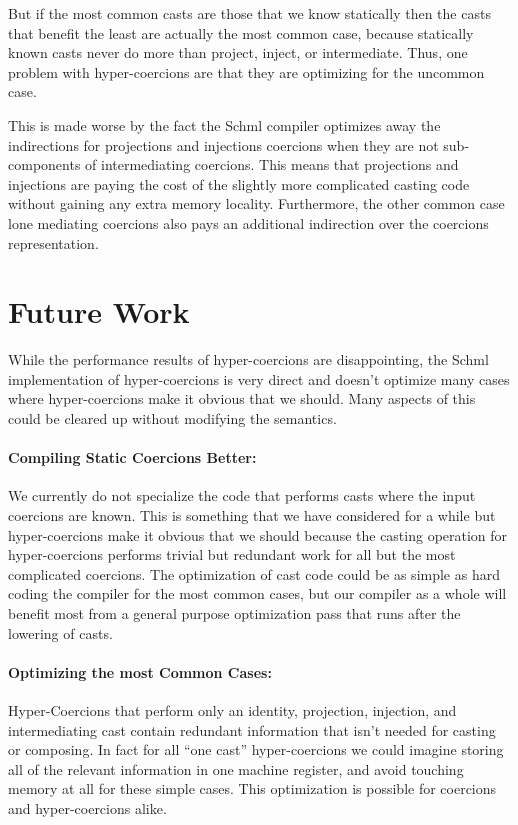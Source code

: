 \documentclass[acmtog, authorversion, acmlarge]{acmart}
\begin{document}
But if the most common casts are those that we know statically
then the casts that benefit the least are actually the most
common case, because statically known casts never do more
than project, inject, or intermediate. Thus, one problem
with hyper-coercions are that they are optimizing for the uncommon case. 

This is made worse by the fact the Schml compiler optimizes
away the indirections for projections and injections coercions
when they are not sub-components of intermediating coercions.
This means that projections and injections are paying the cost
of the slightly more complicated casting code without gaining
any extra memory locality. Furthermore, the other common
case lone mediating coercions also pays an additional indirection
over the coercions representation.

\section{Future Work}
\label{sec:future_work}
While the performance results of hyper-coercions are
disappointing, the Schml implementation of hyper-coercions
is very direct and doesn't optimize many cases where
hyper-coercions make it obvious that we should.
Many aspects of this could be cleared up without modifying
the semantics.

\paragraph{Compiling Static Coercions Better:}
We currently do not specialize the code that performs
casts where the input coercions are known. This is
something that we have considered for a while
but hyper-coercions make it obvious that we should
because the casting operation for hyper-coercions
performs trivial but redundant work for all but
the most complicated coercions. The optimization
of cast code could be as simple as
hard coding the compiler for the most common
cases, but our compiler as a whole will benefit
most from a general purpose optimization pass
that runs after the lowering of casts.

\paragraph{Optimizing the most Common Cases:}
Hyper-Coercions that perform only an identity,
projection, injection, and intermediating cast
contain redundant information that isn't needed
for casting or composing. In fact for all ``one cast''
hyper-coercions we could imagine storing all of the
relevant information in one machine register, and
avoid touching memory at all for these simple
cases. This optimization is possible for coercions
and hyper-coercions alike. 
\end{document}
